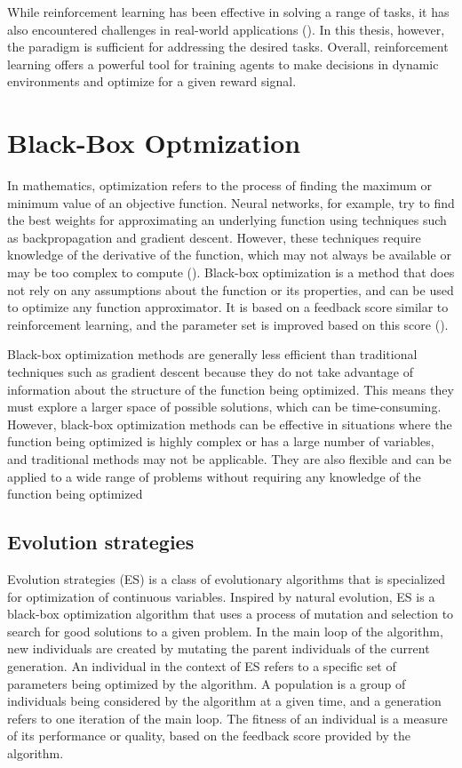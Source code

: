 While reinforcement learning has been effective in solving a range of tasks, it has also encountered challenges in real-world applications (\cite{zhu_ingredients_2020}). In this thesis, however, the paradigm is sufficient for addressing the desired tasks. Overall, reinforcement learning offers a powerful tool for training agents to make decisions in dynamic environments and optimize for a given reward signal.

\section{Black-Box Optmization}

In mathematics, optimization refers to the process of finding the maximum or minimum value of an objective function. Neural networks, for example, try to find the best weights for approximating an underlying function using techniques such as backpropagation and gradient descent. However, these techniques require knowledge of the derivative of the function, which may not always be available or may be too complex to compute (\cite{schaul_studies_nodate}). Black-box optimization is a method that does not rely on any assumptions about the function or its properties, and can be used to optimize any function approximator. It is based on a feedback score similar to reinforcement learning, and the parameter set is improved based on this score (\cite{anderson_introduction_1995}).

Black-box optimization methods are generally less efficient than traditional techniques such as gradient descent because they do not take advantage of information about the structure of the function being optimized. This means they must explore a larger space of possible solutions, which can be time-consuming. However, black-box optimization methods can be effective in situations where the function being optimized is highly complex or has a large number of variables, and traditional methods may not be applicable. They are also flexible and can be applied to a wide range of problems without requiring any knowledge of the function being optimized

\subsection{Evolution strategies}

Evolution strategies (ES) is a class of evolutionary algorithms that is specialized for optimization of continuous variables. Inspired by natural evolution, ES is a black-box optimization algorithm that uses a process of mutation and selection to search for good solutions to a given problem. In the main loop of the algorithm, new individuals are created by mutating the parent individuals of the current generation. An individual in the context of ES refers to a specific set of parameters being optimized by the algorithm. A population is a group of individuals being considered by the algorithm at a given time, and a generation refers to one iteration of the main loop. The fitness of an individual is a measure of its performance or quality, based on the feedback score provided by the algorithm.

